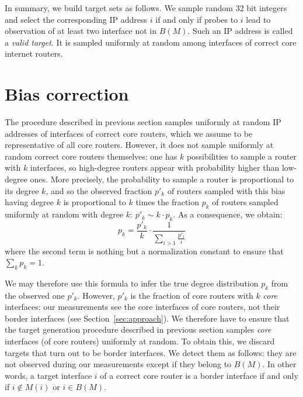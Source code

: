 \documentclass[conference]{IEEEtran}
\begin{document}
In summary, we build target sets as follows. We sample random 32 bit integers and select the corresponding IP address $i$ if and only if probes to $i$ lead to observation of at least two interface not in $B(M)$. Such an IP address is called a {\em valid target}. It is sampled uniformly at random among interfaces of correct core internet routers.


\section{Bias correction} \label{sec:bias}

The procedure described in previous section samples uniformly at random IP addresses of interfaces of correct core routers, which we assume to be representative of all core routers. However, it does not sample uniformly at random correct core routers themselves: one has $k$ possibilities to sample a router with $k$ interfaces, so high-degree routers appear with probability higher than low-degree ones. More precisely, the probability to sample a router is proportional to its degree $k$, and so the observed fraction $p'_k$ of routers sampled with this bias having degree $k$ is proportional to $k$ times the fraction $p_k$ of routers sampled uniformly at random with degree $k$: $p'_k \sim k\cdot p_k$. As a consequence, we obtain:
$$
p_k = \frac{p'_k}{k} \cdot \frac{1}{\sum_{i>1}\frac{p'_i}{i}}
$$
where the second term is nothing but a normalization constant to ensure that $\sum_k p_k = 1$.

We may therefore use this formula to infer the true degree distribution $p_k$ from the observed one $p'_k$. However, $p'_k$ is the fraction of core routers with $k$ {\em core} interfaces: our measurements see the core interfaces of core routers, not their border interfaces (see Section~\ref{sec:approach}). We therefore have to ensure that the target generation procedure described in previous section samples {\em core} interfaces (of core routers) uniformly at random. To obtain this, we discard targets that turn out to be border interfaces. We detect them as follows: they are not observed during our measurements except if they belong to $B(M)$. In other words, a target interface $i$ of a correct core router is a border interface if and only if $i \not\in M(i)$ or $i \in B(M)$.
\end{document}
